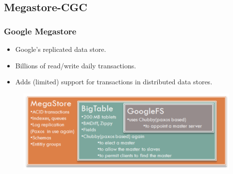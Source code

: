 \documentclass{beamer}
\begin{document}
\subsection{Megastore-CGC}
\begin{frame}
    \frametitle{Google Megastore}
    \begin{itemize}
        \item Google's replicated data store.
        \item Billions  of read/write daily transactions.
        \item Adds (limited) support for transactions  in distributed data stores.   
    \end{itemize}
    \begin{figure}
        \includegraphics[width=\textwidth]{img/megastore.png}
    \end{figure}
\end{frame}
\end{document}
